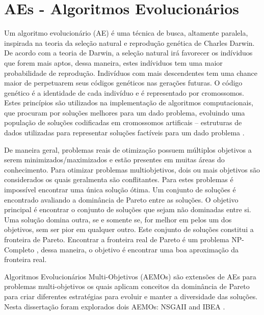 
\section{AEs - Algoritmos Evolucionários}

Um algoritmo evolucionário (AE) é uma técnica de busca, altamente paralela, inspirada na teoria da seleção natural e reprodução genética de Charles Darwin. De acordo com a teoria de Darwin, a seleção natural irá favorecer os indíviduos que forem mais aptos, dessa maneira, estes indíviduos tem uma maior probabilidade
de reprodução. Indivíduos com mais descendentes tem uma chance maior de perpetuarem seus códigos genéticos nas gerações futuras. O código genético é a identidade de cada indivíduo e é representado por cromossomos. Estes princípios são utilizados na implementação de algoritmos computacionais, que procuram por soluções melhores para um dado problema, evoluindo uma população 
de soluções codificadas em cromossomos artificais -- estruturas de dados utilizadas para representar soluções factíveis para um dado problema \cite{pacheco1999algoritmos}.

De maneira geral, problemas reais de otimização possuem múltiplos objetivos a serem minimizados/maximizados e estão presentes em muitas áreas do conhecimento.
Para otimizar problemas multiobjetivos, dois ou mais objetivos são considerados os quais geralmenta são conflitantes. Para estes problemas é impossível encontrar uma
única solução ótima. Um conjunto de soluções é encontrado avaliando a dominância de Pareto \cite{pareto} entre as soluções. O objetivo principal é encontrar o conjunto  
de soluções que sejam não dominadas entre si. Uma solução domina outra, se e somente se, for melhor em pelos um dos objetivos, sem ser pior em qualquer outro.
Este conjunto de soluções constitui a fronteira de Pareto. Encontrar a fronteira real de Pareto é um problema NP-Completo \cite{fonseca2005tutorial}, dessa maneira,
o objetivo é encontrar uma boa aproximação da fronteira real.

Algoritmos Evolucionários Multi-Objetivos (AEMOs) são extensões de AEs para problemas multi-objetivos os quais aplicam
conceitos da dominância de Pareto para criar diferentes estratégias para evoluir e manter a diversidade das soluções.
Nesta dissertação foram explorados dois AEMOs: NSGAII \cite{deb2002fast} and IBEA \cite{zitzler2004indicator}.

